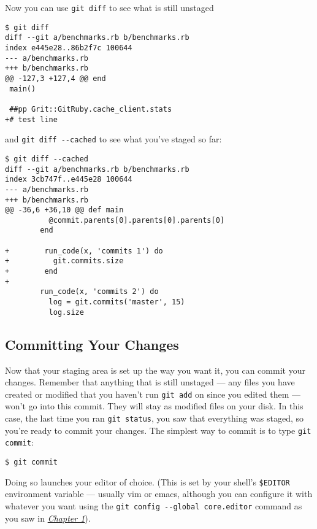 \documentclass[a4paper]{book}
\newcommand{\prechap}{Chapter }
\newcommand{\postchap}{}
\newcommand{\chapref}[1]{\hyperref[chap:#1]{\prechap #1\postchap}}
\begin{document}
Now you can use \texttt{git diff} to see what is still unstaged

\begin{shaded}\begin{verbatim}
$ git diff
diff --git a/benchmarks.rb b/benchmarks.rb
index e445e28..86b2f7c 100644
--- a/benchmarks.rb
+++ b/benchmarks.rb
@@ -127,3 +127,4 @@ end
 main()

 ##pp Grit::GitRuby.cache_client.stats
+# test line
\end{verbatim}\end{shaded}

and \texttt{git diff -{}-cached} to see what you've staged so far:

\begin{shaded}\begin{verbatim}
$ git diff --cached
diff --git a/benchmarks.rb b/benchmarks.rb
index 3cb747f..e445e28 100644
--- a/benchmarks.rb
+++ b/benchmarks.rb
@@ -36,6 +36,10 @@ def main
          @commit.parents[0].parents[0].parents[0]
        end

+        run_code(x, 'commits 1') do
+          git.commits.size
+        end
+
        run_code(x, 'commits 2') do
          log = git.commits('master', 15)
          log.size
\end{verbatim}\end{shaded}

\subsection{Committing Your Changes}\label{committing-your-changes}

Now that your staging area is set up the way you want it, you can commit your changes. Remember that anything that is still unstaged --- any files you have created or modified that you haven't run \texttt{git add} on since you edited them --- won't go into this commit. They will stay as modified files on your disk. In this case, the last time you ran \texttt{git status}, you saw that everything was staged, so you're ready to commit your changes. The simplest way to commit is to type \texttt{git commit}:

\begin{shaded}\begin{verbatim}
$ git commit
\end{verbatim}\end{shaded}

Doing so launches your editor of choice. (This is set by your shell's \texttt{\$EDITOR} environment variable --- usually vim or emacs, although you can configure it with whatever you want using the \texttt{git config -{}-global core.editor} command as you saw in \emph{\chapref{1}}).
\end{document}
